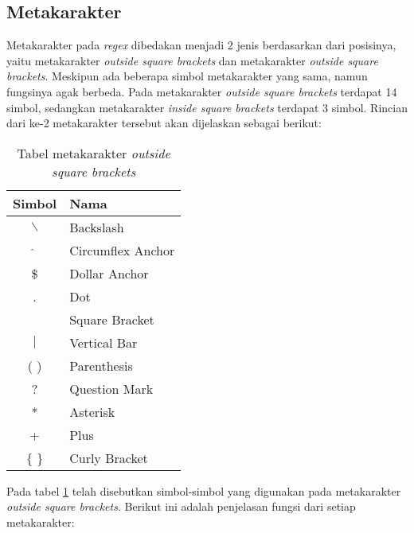 \subsection{Metakarakter}

Metakarakter pada \textit{regex} dibedakan menjadi 2 jenis berdasarkan dari posisinya, yaitu metakarakter \textit{outside square brackets} dan metakarakter \textit{outside square brackets}. Meskipun ada beberapa simbol metakarakter yang sama, namun fungsinya agak berbeda. Pada metakarakter \textit{outside square brackets} terdapat 14 simbol, sedangkan metakarakter \textit{inside square brackets} terdapat 3 simbol. Rincian dari ke-2 metakarakter tersebut akan dijelaskan sebagai berikut:
	
\begin{table}[H]
	\caption {Tabel metakarakter \textit{outside square brackets}} \label{tab:metacharacters-outside}
	\begin{center}
		\begin{tabular}{|c|l|}
		\hline 
		Simbol & Nama \\ 
		\hline 
		$\backslash$ & Backslash \\ 
		\hline 
		$\hat{}$ & Circumflex Anchor\\ 
		\hline 
		\$ & Dollar Anchor\\ 
		\hline 
		. & Dot \\ 
		\hline 
		[ ] & Square Bracket \\ 
		\hline 
		$\vert$ & Vertical Bar \\ 
		\hline 
		( ) & Parenthesis \\ 
		\hline 
		? & Question Mark \\ 
		\hline 
		* & Asterisk \\ 
		\hline 
		+ & Plus \\ 
		\hline 
		$\lbrace$ $\rbrace$ & Curly Bracket \\ 
		\hline 
		\end{tabular} 
	\end{center}
\end{table}

Pada tabel \ref{tab:metacharacters-outside} telah disebutkan simbol-simbol yang digunakan pada metakarakter \textit{outside square brackets}. Berikut ini adalah penjelasan fungsi dari setiap metakarakter:

